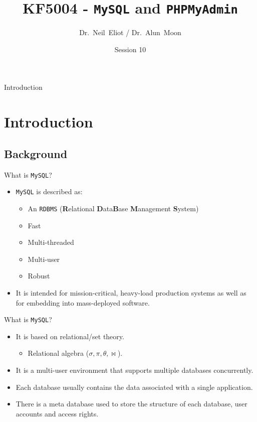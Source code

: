 \documentclass[xcolor=table]{beamer}
\title{KF5004 - \texttt{MySQL} and \texttt{PHPMyAdmin}}
\author{Dr.~Neil~Eliot\inst{1} / Dr.~Alun~Moon\inst{1}}
\institute[Northumbria University] %
{
  \inst{1}
  Department of Computer and Information Sciences\\
  University of Northumbria
}
\date{Session 10}
\begin{document}
\begin{frame}
  \titlepage
\end{frame}

\begin{frame}{Introduction}
  \tableofcontents
\end{frame}


\section{Introduction}
\subsection{Background}
\begin{frame}{What is \texttt{MySQL}?}
  \begin{itemize}
    \item \texttt{MySQL} is described as:
      \begin{itemize}
        \item An \texttt{RDBMS} (\textbf{R}elational \textbf{D}ata\textbf{B}ase \textbf{M}anagement \textbf{S}ystem)
        \item Fast
        \item Multi-threaded
        \item Multi-user
        \item Robust 
      \end{itemize}
    \item It is intended for mission-critical, heavy-load production systems as well as for embedding into mass-deployed software.
  \end{itemize}
\end{frame}

\begin{frame}{What is \texttt{MySQL}?}
  \begin{itemize}
    \item It is based on relational/set theory.
      \begin{itemize}
        \item Relational algebra ($\sigma,\pi,\theta,\bowtie$). 
      \end{itemize}
    \item It is a multi-user environment that supports multiple databases concurrently.
    \item Each database usually contains the data associated with a single application.
    \item There is a meta database used to store the structure of each database, user accounts and access rights.
  \end{itemize}
\end{frame}
\end{document}
